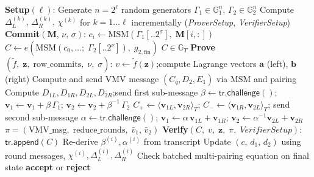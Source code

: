 \begin{algorithm}[H]
\caption{Dory Setup, Commit, Prove, Verify}
\label{alg:dory-all}
\begin{algorithmic}[1]
\Statex \textbf{Setup}$(\ell)$: 
\State Generate $n = 2^\ell$ random generators $\Gamma_1 \in \mathbb{G}_1^n$,
       $\Gamma_2 \in \mathbb{G}_2^n$
\State Compute $\Delta_L^{(k)},\,\Delta_R^{(k)},\,\chi^{(k)}$ for
       $k=1\ldots\ell$ incrementally
\State \Return (\textit{ProverSetup}, \textit{VerifierSetup})
\Statex
\Statex \textbf{Commit}$(\mathbf{M},\,\nu,\,\sigma)$:
    \State $c_i \gets \mathrm{MSM}(\Gamma_1[..2^\sigma],\;\mathbf{M}[i,:])$
\EndFor
\State $C \gets e\!\left(\mathrm{MSM}(c_0,\ldots;\;\Gamma_2[..2^\nu]),\;
       g_{2,\mathrm{fin}}\right)$
\State \Return $C \in \mathbb{G}_T$
\Statex
\Statex \textbf{Prove}$(\tilde{f},\;\mathbf{z},\;\text{row\_commits},\;\nu,\;\sigma)$:
\State $v \gets \tilde{f}(\mathbf{z})$;\quad compute Lagrange vectors $\mathbf{a}$
       (left), $\mathbf{b}$ (right)
\State Compute and send VMV message $(C_q, D_2, E_1)$ via MSM and pairing
    \State Compute $D_{1L}, D_{1R}, D_{2L}, D_{2R}$;\quad send first sub-message
    \State $\beta \gets \mathsf{tr}.\mathsf{challenge}()$;\quad
           $\mathbf{v}_1 \gets \mathbf{v}_1 + \beta\,\Gamma_1$;\quad
           $\mathbf{v}_2 \gets \mathbf{v}_2 + \beta^{-1}\,\Gamma_2$
    \State $C_+ \gets \langle\mathbf{v}_{1L},\mathbf{v}_{2R}\rangle_T$;\quad
           $C_- \gets \langle\mathbf{v}_{1R},\mathbf{v}_{2L}\rangle_T$;\quad
           send second sub-message
    \State $\alpha \gets \mathsf{tr}.\mathsf{challenge}()$;\quad
           $\mathbf{v}_1 \gets \alpha\,\mathbf{v}_{1L}+\mathbf{v}_{1R}$;\quad
           $\mathbf{v}_2 \gets \alpha^{-1}\mathbf{v}_{2L}+\mathbf{v}_{2R}$
\EndFor
\State \Return $\pi = (\text{VMV\_msg},\;\text{reduce\_rounds},\;\bar{v}_1,\,\bar{v}_2)$
\Statex
\Statex \textbf{Verify}$(C,\;v,\;\mathbf{z},\;\pi,\;\textit{VerifierSetup})$:
\State $\mathsf{tr}.\mathsf{append}(C)$
    \State Re-derive $\beta^{(i)},\alpha^{(i)}$ from transcript
    \State Update $(c,\,d_1,\,d_2)$ using round messages,
           $\chi^{(i)},\Delta_L^{(i)},\Delta_R^{(i)}$
\EndFor
\State Check batched multi-pairing equation on final state
\State \Return \textbf{accept} or \textbf{reject}
\end{algorithmic}
\end{algorithm}

